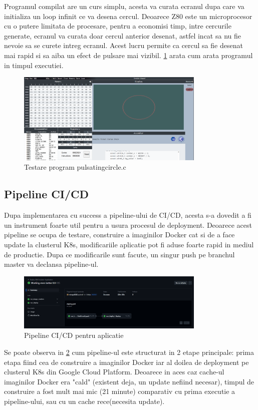 \documentclass[titlepage,12pt]{article}
\DeclareRobustCommand{\code}[1]{{\ttfamily\small #1}}
\begin{document}
Programul compilat are un curs simplu, acesta va curata ecranul dupa care va initializa un loop infinit ce va desena cercul. Deoarece Z80 este un microprocesor cu o putere limitata de procesare, pentru a economisi timp, intre cercurile generate, ecranul va curata doar cercul anterior desenat, astfel incat sa nu fie nevoie sa se curete intreg ecranul. Acest lucru permite ca cercul sa fie desenat mai rapid si sa aiba un efect de pulsare mai vizibil. \cref{fig:pulsatingcircle} arata cum arata programul in timpul executiei.

\begin{figure}[H]
\centering
\includegraphics[width=0.8\textwidth]{images/circleprogram.png}
\caption{Testare program \code{pulsatingcircle.c}}
\label{fig:pulsatingcircle}
\end{figure}

\subsection{Pipeline CI/CD}
Dupa implementarea cu success a pipeline-ului de CI/CD, acesta s-a dovedit a fi un instrument foarte util pentru a usura procesul de deployment. Deoarece acest pipeline se ocupa de testare, construire a imaginilor Docker cat si de a face update la clusterul \ac {K8s}, modificariile aplicatie pot fi aduse foarte rapid in mediul de productie. Dupa ce modificarile sunt facute, un singur push pe branchul \code{master} va declansa pipeline-ul.
\begin{figure}[H]
\centering
\includegraphics[width=0.8\textwidth]{images/cicd_deploy.png}
\caption{Pipeline CI/CD pentru aplicatie}
\label{fig:cicddep}
\end{figure}
Se poate observa in \cref{fig:cicddep} cum pipeline-ul este structurat in 2 etape principale: prima etapa fiind cea de construire a imaginilor Docker iar al doilea de deployment pe clusterul \ac {K8s} din Google Cloud Platform. Deoarece in aces caz cache-ul imaginilor Docker era "cald" (existent deja, un update nefiind necesar), timpul de construire a fost mult mai mic (21 minute) comparativ cu prima executie a pipeline-ului, sau cu un cache rece(necesita update).
\end{document}
